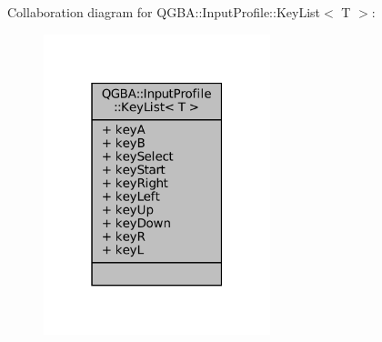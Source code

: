 Collaboration diagram for Q\+G\+BA\+:\+:Input\+Profile\+:\+:Key\+List$<$ T $>$\+:
\nopagebreak
\begin{figure}[H]
\begin{center}
\leavevmode
\includegraphics[width=187pt]{struct_q_g_b_a_1_1_input_profile_1_1_key_list__coll__graph}
\end{center}
\end{figure}
